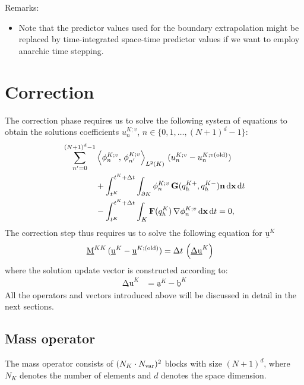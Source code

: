 \documentclass{scrreprt}
\newcommand{\partialup}{\partial}
\theoremstyle{definition}
\theoremstyle{nonumberplain}
\renewcommand{\vec}[1]{{\textbf{#1}}}
\newcommand{\laVec}[1]{\underline{\mathrm{#1}}}
\newcommand{\laMat}[1]{\underline{\mathrm{#1}}}
\newcommand{\cell}{K}
\newcommand{\Ncell}{{N_{\cell}}}
\newcommand{\cellBnd}{{\partialup\cell}}
\newcommand{\dt}{\textup{d}t}
\newcommand{\dV}{\text{d}\vec{x}}
\begin{document}
Remarks:
\begin{itemize}
  \item Note that the predictor values used for the boundary extrapolation might
  be replaced by time-integrated space-time predictor values if
  we want to employ anarchic time stepping.
\end{itemize}

\section{Correction}
The correction phase requires us to solve the following system
of equations
to obtain the solutions
coefficients
$u^{\cell;v}_{n}$,
$n\in\{0,1,\ldots,(N+1)^{d}-1\}$:
\begin{align}
\sum_{n'=0}^{(N+1)^d-1}
&\left\langle 
\phi^{\cell;v}_{n},\,\phi^{\cell;v}_{n'}
\right\rangle
_{L^2(\cell)}
\,
(u^{\cell;v}_{n}-u^{\cell;v(\textup{old})}_{n})
\notag
\\
&+
\int_{t^\cell}^{t^\cell+\Delta t}
\int_\cellBnd
\phi^{\cell;v}_{n}\,\vec{G}(q^{\cell+}_h,q^{\cell-}_h)
\vec{n}\,
\dV\,\dt
\notag
\\
&-
\int_{t^\cell}^{t^\cell+\Delta t}
\int_\cell
\vec{F}(q^{\cell}_h)\,
\nabla \phi^{\cell;v}_{n}\,
\dV\,\dt  = 0,
\end{align}
The correction step thus requires us to solve the following
equation for $\laVec{u}^{\cell}$
\begin{align*}
\laMat{M}^{\cell\cell}\,
(\laVec{u}^{\cell} - \laVec{u}^{\cell;(\textup{old})})
&= \Delta t\,\left (
\laVec{\Delta u}^{\cell}
\right)
\end{align*}
where the solution update vector is constructed according to:
\begin{align*}
\laVec{\Delta u}^{\cell}
&=
\laVec{a}^{\cell}
-
\laVec{b}^{\cell}
\end{align*}
All the operators and vectors introduced above will be discussed
in detail in the next sections. 
\subsection{Mass operator}
The mass operator consists  of ${(\Ncell\cdot N_\textup{var})^2}$ blocks with
size $(N+1)^d$, where $N_\cell$ denotes the number of elements and
$d$ denotes the space dimension.
\end{document}
